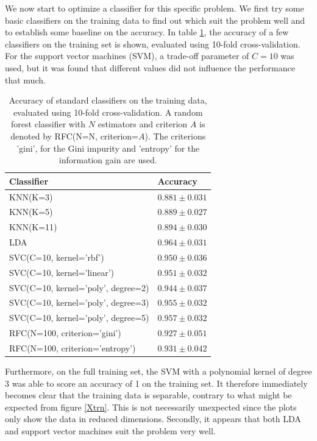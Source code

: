 \documentclass [a4paper] {report}
\begin{document}
	We now start to optimize a classifier for this specific problem. We first try some basic classifiers on the training data to find out which suit the problem well and to establish some baseline on the accuracy. In table \ref{tab:basic}, the accuracy of a few classifiers on the training set is shown, evaluated using 10-fold cross-validation. For the support vector machines (SVM), a trade-off parameter of $C=10$ was used, but it was found that different values did not influence the performance that much.
	
	\begin{table}[H]
		\centering
		\caption{Accuracy of standard classifiers on the training data, evaluated using 10-fold cross-validation. A random forest classifier with $N$ estimators and criterion $A$ is denoted by RFC(N=N, criterion=$A$). The criterions 'gini', for the Gini impurity and 'entropy' for the information gain are used.}
		\label{tab:basic}
		\begin{tabular}{l|l}
			Classifier 							& Accuracy  \\ \hline
			KNN(K=3)						 	& $0.881 \pm 0.031 $\\
			KNN(K=5) 							& $0.889 \pm 0.027 $\\
			KNN(K=11) 							& $0.894 \pm 0.030 $\\
			LDA 								& $0.964 \pm 0.031 $\\
			SVC(C=10, kernel='rbf') 			& $0.950 \pm 0.036 $\\
			SVC(C=10, kernel='linear') 			& $0.951 \pm 0.032 $\\
			SVC(C=10, kernel='poly', degree=2) 	& $0.944 \pm 0.037 $\\
			SVC(C=10, kernel='poly', degree=3) 	& $0.955 \pm 0.032 $\\
			SVC(C=10, kernel='poly', degree=5) 	& $0.957 \pm 0.032 $\\
			RFC(N=100, criterion='gini')		& $0.927 \pm 0.051 $\\
			RFC(N=100, criterion='entropy')		& $0.931 \pm 0.042 $\\
		\end{tabular}		
	\end{table}
	
	\noindent
	Furthermore, on the full training set, the SVM with a polynomial kernel of degree 3 was able to score an accuracy of 1 on the training set. It therefore immediately becomes clear that the training data is separable, contrary to what might be expected from figure \ref{Xtrn}. This is not necessarily unexpected since the plots only show the data in reduced dimensions. Secondly, it appears that both LDA and support vector machines suit the problem very well.\\
	
\end{document}
